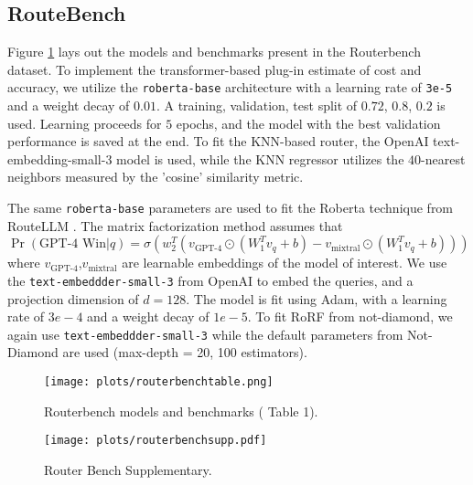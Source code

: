 \subsection{RouteBench}
Figure \ref{fig:routerbench-table} lays out the models and benchmarks present in the Routerbench dataset. To implement the transformer-based plug-in estimate of cost and accuracy, we utilize the \texttt{roberta-base} architecture with a learning rate of \texttt{3e-5} and a weight decay of $0.01$. A training, validation, test split of $0.72$, $0.8$, $0.2$ is used. Learning proceeds for $5$ epochs, and the model with the best validation performance is saved at the end. To fit the KNN-based router, the OpenAI text-embedding-small-3 model is used, while the KNN regressor utilizes the $40$-nearest neighbors measured by the 'cosine' similarity metric.

The same \texttt{roberta-base} parameters are used to fit the Roberta technique from RouteLLM \citep{ong2024routellmlearningroutellms}.  The matrix factorization method assumes that 
\[\Pr(\text{GPT-4 Win}|q) = \sigma(w_2^T(v_{\text{GPT-4}}\odot(W_1^T v_q+b)- v_{\text{mixtral}}\odot(W_1^T v_q+b)) )\]
where $v_{\text{GPT-4}}$,$v_{\text{mixtral}}$ are learnable embeddings of the model of interest. We use the \texttt{text-embeddder-small-3} from OpenAI to embed the queries, and a projection dimension of $d=128$. The model is fit using Adam, with a learning rate of $3e-4$ and a weight decay of $1e-5$. To fit RoRF from not-diamond, we again use \texttt{text-embeddder-small-3} while the default parameters from Not-Diamond are used (max-depth = 20, 100 estimators).
\begin{figure}[H]
    \centering
        \texttt{[image: plots/routerbenchtable.png]} 
\caption{Routerbench models and benchmarks (\citet{hu2024routerbench} Table 1).}
\label{fig:routerbench-table}
\end{figure}

\begin{figure}[h]
    \centering
    \texttt{[image: plots/routerbenchsupp.pdf]}
    \caption{Router Bench Supplementary.}
    \label{fig:rbenchsupp}
\end{figure}


